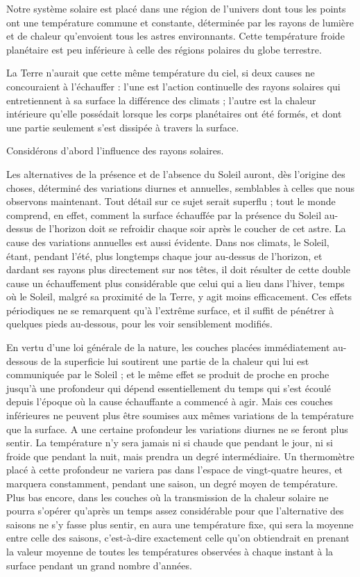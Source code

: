 \documentclass[a4paper, 11pt, oneside, landscape]{article}
\begin{document}
Notre système solaire est placé dans une région de l'univers dont tous les points ont une température commune et constante, déterminée par les rayons de lumière et de chaleur qu'envoient tous les astres environnants. Cette température froide planétaire est peu inférieure à celle des régions polaires du globe terrestre.

La Terre n'aurait que cette même température du ciel, si deux causes ne concouraient à l'échauffer : l'une est l'action continuelle des rayons solaires qui entretiennent à sa surface la différence des climats ; l'autre est la chaleur intérieure qu'elle possédait lorsque les corps planétaires ont été formés, et dont une partie seulement s'est dissipée à travers la surface.

Considérons d'abord l'influence des rayons solaires.

Les alternatives de la présence et de l'absence du Soleil auront, dès l'origine des choses, déterminé des variations diurnes et annuelles, semblables à celles que nous observons maintenant. Tout détail sur ce sujet serait superflu ; tout le monde comprend, en effet, comment la surface échauffée par la présence du Soleil au-dessus de l'horizon doit se refroidir chaque soir après le coucher de cet astre. La cause des variations annuelles est aussi évidente. Dans nos climats, le Soleil, étant, pendant l'été, plus longtemps chaque jour au-dessus de l'horizon, et dardant ses rayons plus directement sur nos têtes, il doit résulter de cette double cause un échauffement plus considérable que celui qui a lieu dans l'hiver, temps où le Soleil, malgré sa proximité de la Terre, y agit moins efficacement. Ces effets périodiques ne se remarquent qu'à l'extrême surface, et il suffit de pénétrer à quelques pieds au-dessous, pour les voir sensiblement modifiés.

En vertu d'une loi générale de la nature, les couches placées immédiatement au-dessous de la superficie lui soutirent une partie de la chaleur qui lui est communiquée par le Soleil ; et le même effet se produit de proche en proche jusqu'à une profondeur qui dépend essentiellement du temps qui s'est écoulé depuis l'époque où la cause échauffante a commencé à agir. Mais ces couches inférieures ne peuvent plus être soumises aux mêmes variations de la température que la surface. A une certaine profondeur les variations diurnes ne se feront plus sentir. La température n'y sera jamais ni si chaude que pendant le jour, ni si froide que pendant la nuit, mais prendra un degré intermédiaire. Un thermomètre placé à cette profondeur ne variera pas dans l'espace de vingt-quatre heures, et marquera constamment, pendant une saison, un degré moyen de température. Plus bas encore, dans les couches où la transmission de la chaleur solaire ne pourra s'opérer qu'après un temps assez considérable pour que l'alternative des saisons ne s'y fasse plus sentir, en aura une température fixe, qui sera la moyenne entre celle des saisons, c'est-à-dire exactement celle qu'on obtiendrait en prenant la valeur moyenne de toutes les températures observées à chaque instant à la surface pendant un grand nombre d'années.
\end{document}
